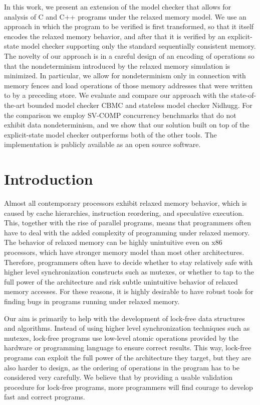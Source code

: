
In this work, we present an extension of the \divine model checker that allows for analysis of C and C++ programs under the \xtso relaxed memory model.
We use an approach in which the program to be verified is first transformed, so
that it itself encodes the relaxed memory behavior, and after that it is  verified by
an explicit-state model checker supporting only the standard sequentially consistent memory.
The novelty of our approach is in a careful design of an encoding of \xtso
operations so that the nondeterminism introduced by the relaxed memory simulation is minimized.
In particular, we allow for nondeterminism only in connection with memory
fences and load operations of
those memory addresses that were written to by a preceding store.
We evaluate and compare our approach with the state-of-the-art bounded model
checker CBMC and stateless model checker Nidhugg. For the comparison  we employ SV-COMP concurrency benchmarks that do not
exhibit data nondeterminism, and we show that our solution built on top of
the explicit-state model checker outperforms both of the other tools.
The implementation is publicly available as an open source software.

\section{Introduction}\label{sec:intro}

Almost all contemporary processors exhibit relaxed memory behavior, which is caused by cache hierarchies, instruction reordering, and speculative execution.
This, together with the rise of parallel programs, means that programmers often have to deal with the added complexity of programming under relaxed memory.
The behavior of relaxed memory can be highly unintuitive even on x86 processors, which have stronger memory model than most other architectures.
Therefore, programmers often have to decide whether to stay relatively safe with
higher level synchronization constructs such as mutexes, or whether to tap to the full power of the architecture and risk subtle unintuitive behavior of relaxed memory accesses.
For these reasons, it is highly desirable to have robust tools for finding bugs in programs running under relaxed memory.

Our aim is primarily to help with the development of lock-free data structures and algorithms.
Instead of using higher level synchronization techniques such as mutexes, lock-free programs use low-level atomic operations provided by the hardware or programming language to ensure correct results.
This way, lock-free programs can exploit the full power of the architecture they target, but they are also harder to design, as the ordering of operations in the program has to be considered very carefully.
We believe that by providing a usable validation procedure for lock-free
programs, more programmers will find courage to develop fast and correct programs.

